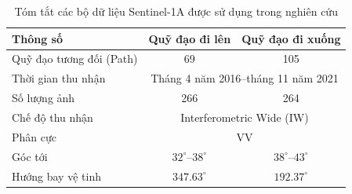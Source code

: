 \begin{table}[htbp]
	\centering
	\caption{Tóm tắt các bộ dữ liệu Sentinel-1A được sử dụng trong nghiên cứu}
	\label{tab:sentinel1_info}
	\begin{tabular}{lcc}
		\toprule
		\textbf{Thông số} & \textbf{Quỹ đạo đi lên} & \textbf{Quỹ đạo đi xuống} \\
		\midrule
		Quỹ đạo tương đối (Path) & 69 & 105 \\
		\multicolumn{1}{l}{Thời gian thu nhận} & \multicolumn{2}{c}{Tháng 4 năm 2016--tháng 11 năm 2021} \\
		Số lượng ảnh      & 266 & 264 \\
		\multicolumn{1}{l}{Chế độ thu nhận} & \multicolumn{2}{c}{Interferometric Wide (IW)} \\
		\multicolumn{1}{l}{Phân cực} & \multicolumn{2}{c}{VV} \\
		Góc tới & $32^{\circ}$--$38^{\circ}$ & $38^{\circ}$--$43^{\circ}$ \\
		Hướng bay vệ tinh & $347.63^{\circ}$ & $192.37^{\circ}$ \\
		\bottomrule
	\end{tabular}
\end{table}

\clearpage
